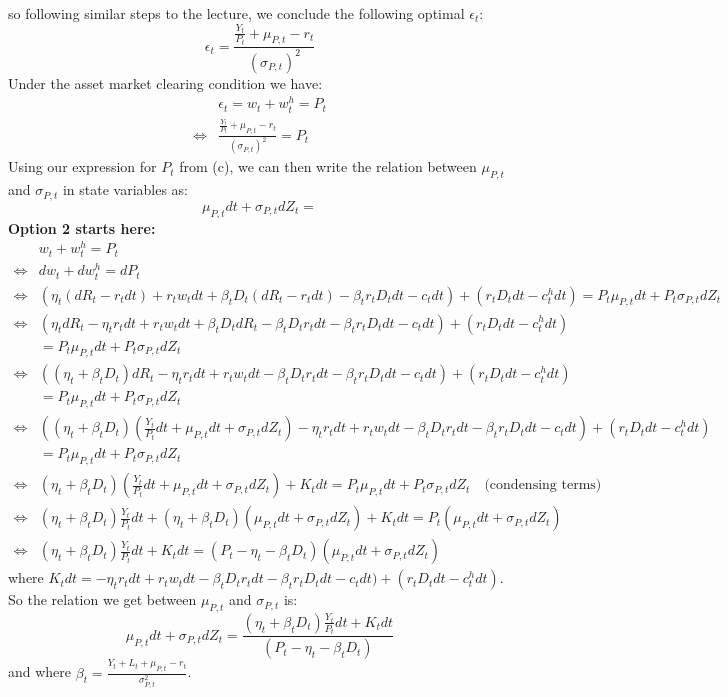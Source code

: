 \documentclass{article}
\begin{document}
so following similar steps to the lecture, we conclude the following optimal $\epsilon_t$:
\[
\epsilon_t = \frac{\frac{Y_t}{P_t} + \mu_{P, t} - r_t}{(\sigma_{P, t})^2}    
\]
Under the asset market clearing condition we have:
\[\begin{aligned}
   &\epsilon_t = w_t + w_t^h = P_t   \\ 
    \iff &\frac{\frac{Y_t}{P_t} + \mu_{P, t} - r_t}{(\sigma_{P, t})^2} = P_t
\end{aligned}\]
Using our expression for $P_t$ from (c), we can then write the relation between $\mu_{P, t}$ and $\sigma_{P, t }$ in state variables as:
\[
    \mu_{P, t} d t + \sigma_{P, t} d Z_t =     
\]
\textbf{Option 2 starts here:}
\[
\begin{aligned}
    &w_t + w_t^h = P_t   \\ 
    \iff & d w_t + d w_t^h = d P_t \\
    \iff & (\eta_t  (d R_t - r_t d t)  + r_t w_t d t + \beta_t D_t (d R_t - r_t d t) - \beta_t r_t D_t d t  - c_t d t) + (r_t D_t d t  - c_t^h d t) =  P_t \mu_{P, t} d t+P_t \sigma_{P, t} d Z_{t} \\ %
    \iff &(\eta_t  d R_t - \eta_t r_t d t  + r_t w_t d t + \beta_t D_t d R_t - \beta_t D_t r_t d t - \beta_t r_t D_t d t  - c_t d t) + (r_t D_t d t  - c_t^h d t) \\
    &=  P_t \mu_{P, t} d t+P_t \sigma_{P, t} d Z_{t}\\
    \iff &((\eta_t + \beta_t D_t)  d R_t - \eta_t r_t d t  + r_t w_t d t - \beta_t D_t r_t d t - \beta_t r_t D_t d t  - c_t d t) + (r_t D_t d t  - c_t^h d t) \\
    &=  P_t \mu_{P, t} d t+P_t \sigma_{P, t} d Z_{t}\\
    \iff &((\eta_t + \beta_t D_t)  (\frac{Y_t}{P_t} d t + \mu_{P, t} d t+\sigma_{P, t} d Z_{t}  ) - \eta_t r_t d t  + r_t w_t d t - \beta_t D_t r_t d t - \beta_t r_t D_t d t  - c_t d t) + (r_t D_t d t  - c_t^h d t) \\
    &=  P_t \mu_{P, t} d t+P_t \sigma_{P, t} d Z_{t}\\
    \iff & (\eta_t + \beta_t D_t)  (\frac{Y_t}{P_t} d t + \mu_{P, t} d t+\sigma_{P, t} d Z_{t}  )  + K_t d t=  P_t \mu_{P, t} d t+P_t \sigma_{P, t} d Z_{t} \quad \text{(condensing terms)}\\
    \iff & (\eta_t + \beta_t D_t) \frac{Y_t}{P_t} d t + (\eta_t + \beta_t D_t) (\mu_{P, t} d t+\sigma_{P, t} d Z_{t}) + K_t d t= P_t (\mu_{P, t} d t+\sigma_{P, t} d Z_{t})\\
    \iff & (\eta_t + \beta_t D_t) \frac{Y_t}{P_t} d t + K_t d t= (P_t - \eta_t - \beta_t D_t)(\mu_{P, t} d t+\sigma_{P, t} d Z_{t})
\end{aligned}
\]
where $K_t d t= - \eta_t r_t d t  + r_t w_t d t - \beta_t D_t r_t d t - \beta_t r_t D_t d t  - c_t d t) + (r_t D_t d t  - c_t^h d t)$.
So the relation we get between $\mu_{P, t}$ and $\sigma_{P, t }$ is:
\[
    \mu_{P, t} d t+\sigma_{P, t} d Z_{t} = \frac{(\eta_t + \beta_t D_t) \frac{Y_t}{P_t} d t + K_t d t}{(P_t - \eta_t - \beta_t D_t)}
\]
and where $\beta_t = \frac{Y_t + L_t + \mu_{P, t} - r_t}{\sigma_{P, t}^2}$.
\end{document}
